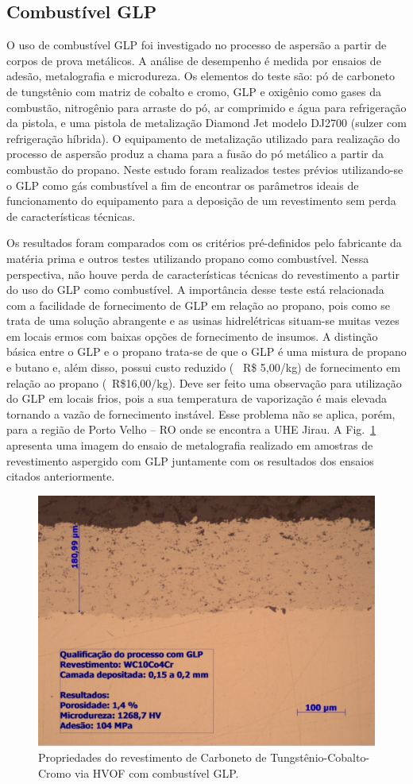 \subsection{Combustível GLP}
O uso de combustível GLP foi investigado no processo de aspersão a partir de
corpos de prova metálicos. A análise de desempenho é medida por ensaios de
adesão, metalografia e microdureza. Os elementos do teste são: pó de carboneto
de tungstênio com matriz de cobalto e cromo, GLP e oxigênio como gases da combustão, nitrogênio para
arraste do pó, ar comprimido e água para refrigeração da pistola, e uma pistola
de metalização Diamond Jet modelo DJ2700 (sulzer com refrigeração híbrida). O
equipamento de metalização utilizado para realização do processo de aspersão
produz a chama para a fusão do pó metálico a partir da combustão do
propano. Neste estudo foram realizados testes prévios utilizando-se o GLP como
gás combustível a fim de encontrar os parâmetros ideais de funcionamento do
equipamento para a deposição de um revestimento sem perda de características
técnicas. 

Os resultados foram comparados com os critérios pré-definidos pelo fabricante
da matéria prima e outros testes utilizando propano como
combustível. Nessa perspectiva, não houve perda de características técnicas do
revestimento a partir do uso do GLP como combustível. A importância desse teste
está relacionada com a facilidade de fornecimento de GLP em relação ao propano,
pois como se trata de uma solução abrangente e as usinas hidrelétricas
situam-se muitas vezes em locais ermos com baixas opções de fornecimento de
insumos. A distinção básica entre o GLP e o propano trata-se de que o GLP é uma
mistura de propano e butano e, além disso, possui custo reduzido (~ R\$ 5,00/kg)
de fornecimento em relação ao propano (~R\$16,00/kg). Deve ser feito uma
observação para utilização do GLP em locais frios, pois a sua temperatura de
vaporização é mais elevada tornando a vazão de fornecimento instável. Esse
problema não se aplica, porém, para a região de Porto Velho – RO onde se
encontra a UHE Jirau. A Fig.~\ref{fig:adequacao3} apresenta uma imagem do
ensaio de metalografia realizado em amostras de revestimento aspergido com GLP juntamente
com os resultados dos ensaios citados anteriormente.

\begin{figure}
	\centering
	\includegraphics[width=1\columnwidth]{method/figs/adequacao/adequacao3.png}
    \caption{Propriedades do revestimento de Carboneto de Tungstênio-Cobalto-Cromo via HVOF com combustível GLP.}
    \label{fig:adequacao3}
\end{figure}